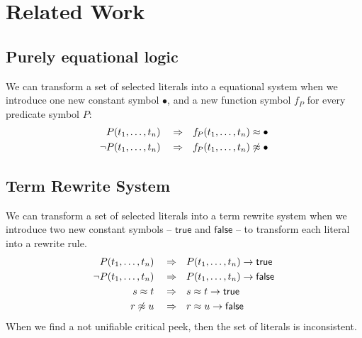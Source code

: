 
\chapter{Related Work}


\section{Purely equational logic}

We can transform a set of selected literals into a equational system 
when we introduce one new constant symbol $\bullet$,
and a new function symbol $f\!_P$ for every predicate symbol $P$:
\begin{align*}
	P(t_1,\ldots,t_n) \quad\Rightarrow&\quad f\!_P(t_1,\ldots,t_n) \approx \bullet \\ 
	\lnot P(t_1,\ldots,t_n) \quad\Rightarrow&\quad f\!_P(t_1,\ldots,t_n) \not\approx \bullet
\end{align*}

\section{Term Rewrite System}

We can transform a set of selected literals into a term rewrite system 
when we introduce two new constant symbols -- $\mathsf{true}$ and $\mathsf{false}$ --
to transform each literal into a rewrite rule.
\begin{align*}
P(t_1,\ldots,t_n) \quad\Rightarrow &\quad P(t_1,\ldots,t_n) \rightarrow \mathsf{true} 
\\ 
\lnot P(t_1,\ldots,t_n) \quad\Rightarrow &\quad P(t_1,\ldots,t_n) \rightarrow \mathsf{false} 
\\
s \approx t \quad\Rightarrow&\quad s \approx t\rightarrow \mathsf{true} 
\\ 
r \not\approx u \quad\Rightarrow&\quad r \approx u\rightarrow  \mathsf{false}
\end{align*}
When we find a not unifiable critical peek, then the set of literals is inconsistent.

